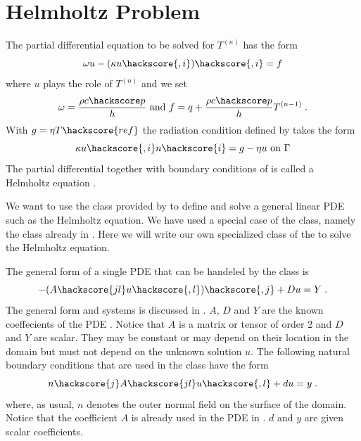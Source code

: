 \section{\label{DIFFUSION HELM SEC}Helmholtz Problem}
The partial differential equation to be solved for $T^{(n)}$ has the form 
\begin{equation}
\omega u  - (\kappa u\hackscore{,i})\hackscore{,i} = f
\label{DIFFUSION HELM EQ 1}
\end{equation}
where $u$ plays the role of $T^{(n)}$ and we set
\begin{equation}
\omega=\frac{\rho c\hackscore p}{h} \mbox{ and } f=q+\frac{\rho c\hackscore p}{h}T^{(n-1)} \;.
\label{DIFFUSION HELM EQ 1b}
\end{equation}
With $g=\eta T\hackscore{ref}$ the radiation condition defined by 
takes the form 
\begin{equation}
\kappa u\hackscore{,i} n\hackscore{i} =  g - \eta u\mbox{ on } \Gamma
\label{DIFFUSION HELM EQ 2}
\end{equation}
The partial differential 
 together with boundary conditions of 
is called a Helmholtz equation . 

We want to use the \LinearPDE class provided by \escript to define and solve a general linear PDE such as the 
Helmholtz equation. We have used a special case of the \LinearPDE class, namely the
\Poisson class already in . 
Here we will write our own specialized class of the \LinearPDE to solve the Helmholtz equation. 

The general form of a single PDE that can be handeled by the \LinearPDE class is 
\begin{equation}\label{EQU.FEM.1}
-(A\hackscore{jl} u\hackscore{,l})\hackscore{,j}+D u =Y \; .
\end{equation}
The general form and systems is discussed in .  
$A$, $D$ and $Y$ are the known coeffecients of the PDE . 
Notice that $A$ is a matrix or tensor of order 2 and $D$ and $Y$ are scalar. 
They may be constant or may depend on their 
location in the domain but must not depend on the unknown solution $u$. 
The following natural boundary conditions  that
are used in the \LinearPDE class have the form
\begin{equation}\label{EQU.FEM.2}
n\hackscore{j}A\hackscore{jl} u\hackscore{,l}+du=y  \;.
\end{equation}
where, as usual, $n$ denotes the outer normal field on the surface of the domain. Notice that 
the coefficient $A$ is already used in the PDE in . $d$ and $y$ are given scalar coefficients.

